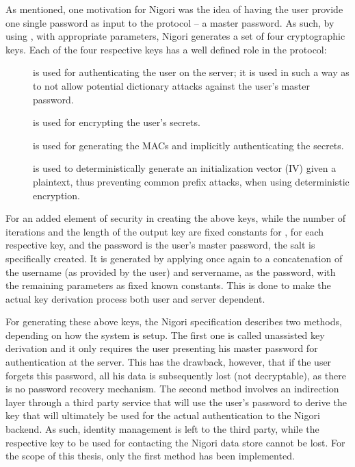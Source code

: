 As mentioned, one motivation for Nigori was the idea of having the user provide one single password as input to the protocol -- a master password.
As such, by using , with appropriate parameters, Nigori generates a set of four cryptographic keys.
Each of the four respective keys has a well defined role in the protocol:

\begin{description}
  \item[] is used for authenticating the user on the server; it is used in such a way as to not allow potential dictionary attacks against the user's master password.
  \item[] is used for encrypting the user's secrets.
  \item[] is used for generating the MACs and implicitly authenticating the secrets.
  \item[] is used to deterministically generate an initialization vector (IV) given a plaintext, thus preventing common prefix attacks, when using deterministic encryption.
\end{description}

For an added element of security in creating the above keys, while the number of iterations and the length of the output key are fixed constants for , for each respective key, and the password is the user's master password, the salt is specifically created.
It is generated by applying  once again to a concatenation of the username (as provided by the user) and servername, as the password, with the remaining parameters as fixed known constants.
This is done to make the actual key derivation process both user and server dependent.

For generating these above keys, the Nigori specification describes two methods, depending on how the system is setup.
The first one is called unassisted key derivation and it only requires the user presenting his master password for authentication at the server.
This has the drawback, however, that if the user forgets this password, all his data is subsequently lost (not decryptable), as there is no password recovery mechanism.
The second method involves an indirection layer through a third party service that will use the user's password to derive the key that will ultimately be used for the actual authentication to the Nigori backend.
As such, identity management is left to the third party, while the respective key to be used for contacting the Nigori data store cannot be lost.
For the scope of this thesis, only the first method has been implemented.


